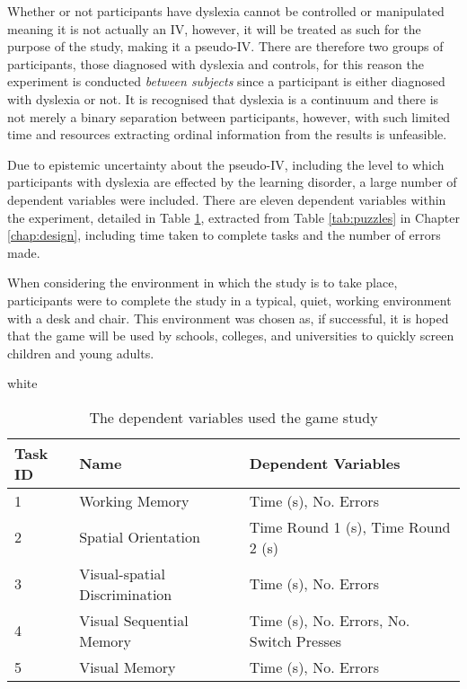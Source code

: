 \documentclass[journal]{IEEEtran}
\newcommand{\tableformat}[4]{
\begin{table}[h]
\centering
  \rowcolors{2}{gray!10} {white}
\begin{tabular}{#1}
  \hline
  \rowcolor[gray]{0.9} #2
\end{tabular}
\caption{#3}
\label{#4}
\end{table}}
\begin{document}
Whether or not participants have dyslexia cannot be controlled or manipulated meaning it is not actually an IV, however, it will be treated as such for the purpose of the study, making it a pseudo-IV. There are therefore two groups of participants, those diagnosed with dyslexia and controls, for this reason the experiment is conducted \emph{between subjects} since a participant is either diagnosed with dyslexia or not\cite{cairns2008}. It is recognised that dyslexia is a continuum and there is not merely a binary separation between participants,  however, with such limited time and resources extracting ordinal information from the results is unfeasible.

Due to epistemic uncertainty about the pseudo-IV, including the level to which participants with dyslexia are effected by the learning disorder, a large number of dependent variables were included. There are eleven dependent variables within the experiment, detailed in Table \ref{tab:dependent}, extracted from Table \ref{tab:puzzles} in Chapter \ref{chap:design}, including time taken to complete tasks and the number of errors made.

When considering the environment in which the study is to take place, participants were to complete the study in a typical, quiet, working environment with a desk and chair. This environment was chosen as, if successful, it is hoped that the game will be used by schools, colleges, and universities to quickly screen children and young adults.

\tableformat{p{2cm} p{5cm} p{3.6cm}}
{Task ID & Name & Dependent Variables \\ \hline
1 & Working Memory & Time (s), No. Errors \\
2 & Spatial Orientation & Time Round 1 (s), Time Round 2 (s) \\
3 & Visual-spatial Discrimination & Time (s), No. Errors \\
4 & Visual Sequential Memory & Time (s), No. Errors, No. Switch Presses \\
5 & Visual Memory & Time (s), No. Errors \\}
{The dependent variables used the game study}{tab:dependent}
\end{document}
